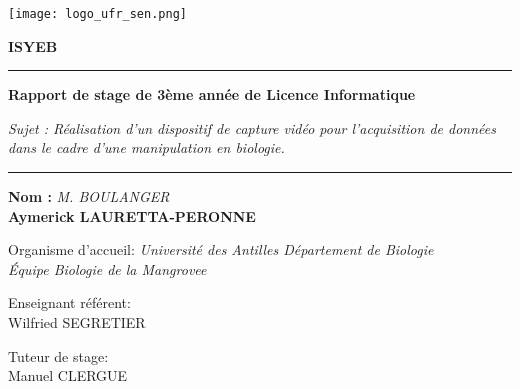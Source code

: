 \begin{titlepage}
    \begin{center}
        \vspace*{0.5cm}

        \texttt{[image: logo\_ufr\_sen.png]}
        \hspace{2cm}

        \vspace{0.5cm}

        \textbf{\Huge{ISYEB}}

        \vspace{0.5cm}

        \rule{\linewidth}{0.5mm}
        \textbf{Rapport de stage de 3ème année de Licence Informatique} 
        
        \vspace{0.2cm}

        \small{\textit{Sujet : Réalisation d'un dispositif de capture vidéo pour l’acquisition de données dans le cadre d’une manipulation en biologie.}}
        \rule{\linewidth}{0.5mm}

        \vspace{1.5cm}

        \textbf{Nom :} \textit{M. BOULANGER} \\
    
        \textbf{Aymerick LAURETTA-PERONNE} \\

        \vfill
                
		{\large Organisme d'accueil: \textsl{Université des Antilles Département de Biologie}} \\[0.1cm]
        \small{\textit{Équipe Biologie de la Mangrovee}} \\[1.5cm]

		\begin{minipage}{0.7\textwidth}
			\begin{flushleft}
				Enseignant référent: \\
				\hspace{0.2cm} Wilfried \textsc{SEGRETIER}
			\end{flushleft}
		\end{minipage}
        
		\vspace{-0.85cm}
		\hspace{9cm}
		\begin{minipage}{0.3\textwidth}
			\begin{flushleft}
				Tuteur de stage: \\
				\hspace{0.2cm} Manuel \textsc{CLERGUE}


\end{flushleft}
\end{minipage}
\end{center}
\end{titlepage}

